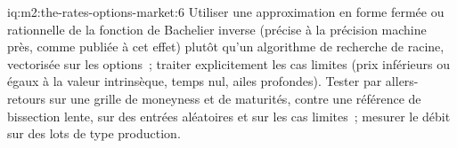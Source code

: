 \begin{solution}{iq:m2:the-rates-options-market:6}
Utiliser une approximation en forme fermée ou rationnelle de la fonction de Bachelier inverse
(précise à la précision machine près, comme publiée à cet effet) plutôt
qu'un algorithme de recherche de racine, vectorisée sur les options~; traiter explicitement les cas limites (prix inférieurs ou égaux à la
valeur intrinsèque, temps nul, ailes profondes). Tester par allers-retours
sur une grille de moneyness et de maturités, contre une référence de bissection lente, sur
des entrées aléatoires et sur les cas limites~; mesurer le débit sur des
lots de type production.
\end{solution}

